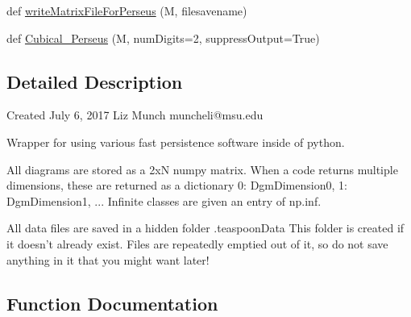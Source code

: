 \begin{DoxyCompactItemize}
\item 
def \hyperlink{namespaceteaspoon_1_1_t_d_a_1_1_persistence_a7ee47776929d1ade75b059415918a328}{write\+Matrix\+File\+For\+Perseus} (M, filesavename)
\item 
def \hyperlink{namespaceteaspoon_1_1_t_d_a_1_1_persistence_aa583aa9a694aeaa3983e77319ac68e84}{Cubical\+\_\+\+Perseus} (M, num\+Digits=2, suppress\+Output=True)
\end{DoxyCompactItemize}


\subsection{Detailed Description}
\begin{DoxyVerb}Created July 6, 2017
Liz Munch
muncheli@msu.edu


Wrapper for using various fast persistence software inside of python.

All diagrams are stored as a 2xN numpy matrix.
When a code returns multiple dimensions, these are returned as a dictionary
{
0: DgmDimension0,
1: DgmDimension1,
...
}
Infinite classes are given an entry of np.inf.

All data files are saved in a hidden folder .teaspoonData
This folder is created if it doesn't already exist.
Files are repeatedly emptied out of it, so do not save anything in it that you might want later!\end{DoxyVerb}
 

\subsection{Function Documentation}
